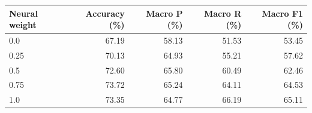 \begin{tabular}{lrrrr}
\toprule
Neural weight & Accuracy (\%) & Macro P (\%) & Macro R (\%) & Macro F1 (\%) \\
\midrule
0.0 & 67.19 & 58.13 & 51.53 & 53.45 \\
0.25 & 70.13 & 64.93 & 55.21 & 57.62 \\
0.5 & 72.60 & 65.80 & 60.49 & 62.46 \\
0.75 & 73.72 & 65.24 & 64.11 & 64.53 \\
1.0 & 73.35 & 64.77 & 66.19 & 65.11 \\
\bottomrule
\end{tabular}
